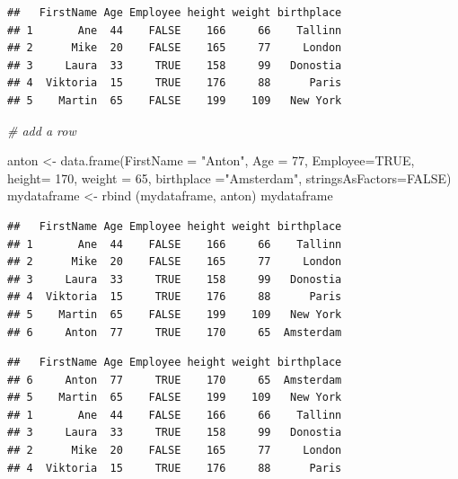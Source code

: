 \documentclass[
]{book}
\newenvironment{Shaded}{\begin{snugshade}}{\end{snugshade}}
\newcommand{\AttributeTok}[1]{\textcolor[rgb]{0.77,0.63,0.00}{#1}}
\newcommand{\CommentTok}[1]{\textcolor[rgb]{0.56,0.35,0.01}{\textit{#1}}}
\newcommand{\ConstantTok}[1]{\textcolor[rgb]{0.00,0.00,0.00}{#1}}
\newcommand{\DecValTok}[1]{\textcolor[rgb]{0.00,0.00,0.81}{#1}}
\newcommand{\FunctionTok}[1]{\textcolor[rgb]{0.00,0.00,0.00}{#1}}
\newcommand{\NormalTok}[1]{#1}
\newcommand{\OtherTok}[1]{\textcolor[rgb]{0.56,0.35,0.01}{#1}}
\newcommand{\SpecialCharTok}[1]{\textcolor[rgb]{0.00,0.00,0.00}{#1}}
\newcommand{\StringTok}[1]{\textcolor[rgb]{0.31,0.60,0.02}{#1}}
\begin{document}
\begin{verbatim}
##   FirstName Age Employee height weight birthplace
## 1       Ane  44    FALSE    166     66    Tallinn
## 2      Mike  20    FALSE    165     77     London
## 3     Laura  33     TRUE    158     99   Donostia
## 4  Viktoria  15     TRUE    176     88      Paris
## 5    Martin  65    FALSE    199    109   New York
\end{verbatim}

\begin{Shaded}
\begin{Highlighting}[]
\CommentTok{\# add a row }

\NormalTok{anton }\OtherTok{\textless{}{-}} \FunctionTok{data.frame}\NormalTok{(}\AttributeTok{FirstName =} \StringTok{"Anton"}\NormalTok{, }\AttributeTok{Age =} \DecValTok{77}\NormalTok{, }\AttributeTok{Employee=}\ConstantTok{TRUE}\NormalTok{, }\AttributeTok{height=} \DecValTok{170}\NormalTok{, }\AttributeTok{weight =} \DecValTok{65}\NormalTok{, }\AttributeTok{birthplace =}\StringTok{"Amsterdam"}\NormalTok{, }\AttributeTok{stringsAsFactors=}\ConstantTok{FALSE}\NormalTok{)}
\NormalTok{mydataframe }\OtherTok{\textless{}{-}} \FunctionTok{rbind}\NormalTok{ (mydataframe, anton)}
\NormalTok{mydataframe}
\end{Highlighting}
\end{Shaded}

\begin{verbatim}
##   FirstName Age Employee height weight birthplace
## 1       Ane  44    FALSE    166     66    Tallinn
## 2      Mike  20    FALSE    165     77     London
## 3     Laura  33     TRUE    158     99   Donostia
## 4  Viktoria  15     TRUE    176     88      Paris
## 5    Martin  65    FALSE    199    109   New York
## 6     Anton  77     TRUE    170     65  Amsterdam
\end{verbatim}

\begin{Shaded}
\end{Shaded}

\begin{verbatim}
##   FirstName Age Employee height weight birthplace
## 6     Anton  77     TRUE    170     65  Amsterdam
## 5    Martin  65    FALSE    199    109   New York
## 1       Ane  44    FALSE    166     66    Tallinn
## 3     Laura  33     TRUE    158     99   Donostia
## 2      Mike  20    FALSE    165     77     London
## 4  Viktoria  15     TRUE    176     88      Paris
\end{verbatim}
\end{document}
